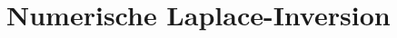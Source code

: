 %
%
%
\chapter{Numerische Laplace-Inversion\label{chapter:laplace}}
\begin{refsection}






\printbibliography[heading=subbibliography]
\end{refsection}
